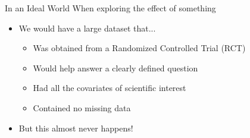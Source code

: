 

\begin{frame}{In an Ideal World}
When exploring the effect of something
  \begin{itemize}
  \item We would have a large dataset that...
  \begin{itemize}
   \item Was obtained from a Randomized Controlled Trial (RCT)
   \item Would help answer a clearly defined question
   \item Had all the covariates of scientific interest
   \item Contained no missing data
  \end{itemize}
\item But this almost never happens!
  \end{itemize}
\end{frame}

